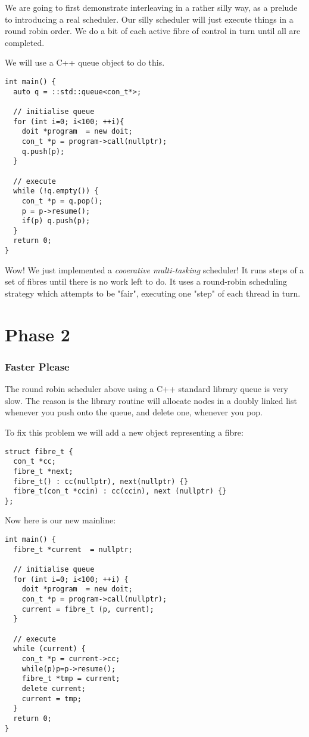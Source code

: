 \documentclass[oneside]{book}
\begin{document}
We are going to first demonstrate interleaving in a rather silly way,
as a prelude to introducing a real scheduler. Our silly scheduler
will just execute things in a round robin order. We do a bit of each
active  fibre of control in turn until all are completed.

We will use a C++ queue object to do this.

\begin{verbatim}
int main() {
  auto q = ::std::queue<con_t*>;

  // initialise queue
  for (int i=0; i<100; ++i){
    doit *program  = new doit;
    con_t *p = program->call(nullptr);
    q.push(p);   
  }

  // execute
  while (!q.empty()) {
    con_t *p = q.pop();
    p = p->resume();
    if(p) q.push(p);
  }
  return 0;
}
\end{verbatim}

Wow! We just implemented a {\em cooerative multi-tasking} scheduler! It runs steps of a
set of fibres until there is no work left to do. It uses a round-robin
scheduling strategy which attempts to be "fair", executing one "step" 
of each thread in turn. 

\chapter{Phase 2}
\subsection{Faster Please}
The round robin scheduler above using a C++ standard library queue is very slow.
The reason is the library routine will allocate nodes in a doubly linked list
whenever you push onto the queue, and delete one, whenever you pop.

To fix this problem we will add a new object representing a fibre:

\begin{verbatim}
struct fibre_t {
  con_t *cc;
  fibre_t *next;
  fibre_t() : cc(nullptr), next(nullptr) {}
  fibre_t(con_t *ccin) : cc(ccin), next (nullptr) {}
};
\end{verbatim}

Now here is our new mainline:

\begin{verbatim}
int main() {
  fibre_t *current  = nullptr;

  // initialise queue
  for (int i=0; i<100; ++i) {
    doit *program  = new doit;
    con_t *p = program->call(nullptr);
    current = fibre_t (p, current);
  }

  // execute
  while (current) {
    con_t *p = current->cc;
    while(p)p=p->resume();
    fibre_t *tmp = current;
    delete current;
    current = tmp;
  }
  return 0;
}
\end{verbatim}
\end{document}
